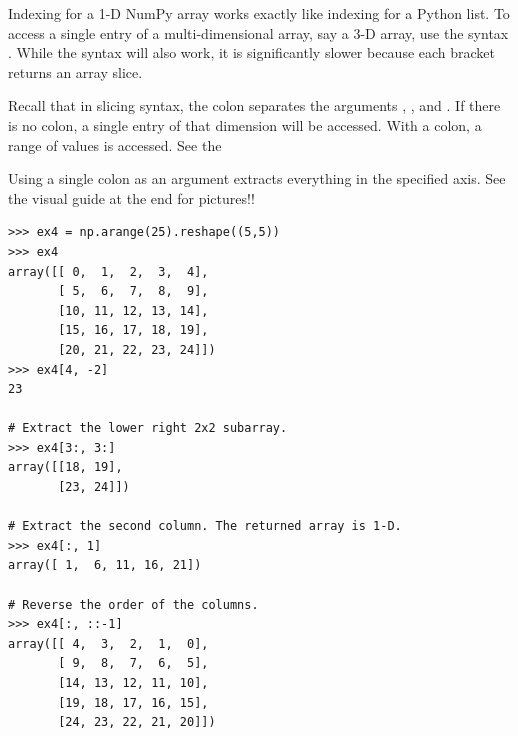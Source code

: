 Indexing for a 1-D NumPy array works exactly like indexing for a Python list. 
To access a single entry of a multi-dimensional array, say a 3-D array, use the syntax .
While the syntax  will also work, it is significantly slower because each bracket returns an array slice.

Recall that in slicing syntax, the colon \li{:} separates the arguments , , and .
If there is no colon, a single entry of that dimension will be accessed.
With a colon, a range of values is accessed.
See the 



Using a single colon as an argument extracts everything in the specified axis.
See the visual guide at the end for pictures!!
\begin{lstlisting}
>>> ex4 = np.arange(25).reshape((5,5)) 
>>> ex4
array([[ 0,  1,  2,  3,  4],
       [ 5,  6,  7,  8,  9],
       [10, 11, 12, 13, 14],
       [15, 16, 17, 18, 19],
       [20, 21, 22, 23, 24]])
>>> ex4[4, -2]
23

# Extract the lower right 2x2 subarray.
>>> ex4[3:, 3:] 
array([[18, 19],
       [23, 24]])
       
# Extract the second column. The returned array is 1-D.
>>> ex4[:, 1] 
array([ 1,  6, 11, 16, 21]) 

# Reverse the order of the columns.
>>> ex4[:, ::-1] 
array([[ 4,  3,  2,  1,  0],
       [ 9,  8,  7,  6,  5],
       [14, 13, 12, 11, 10],
       [19, 18, 17, 16, 15],
       [24, 23, 22, 21, 20]])
\end{lstlisting}

